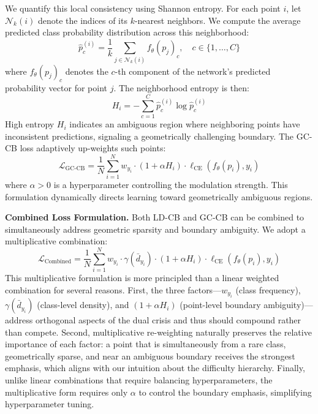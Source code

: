 \documentclass[preprint,12pt]{elsarticle}
\begin{document}
We quantify this local consistency using Shannon entropy. For each point \(i\), let \(\mathcal{N}_k(i)\) denote the indices of its \(k\)-nearest neighbors. We compute the average predicted class probability distribution across this neighborhood:
\begin{equation}
\label{eq:neighborhood_prob}
\hat{p}_c^{(i)} = \frac{1}{k} \sum_{j \in \mathcal{N}_k(i)} f_\theta(p_j)_c, \quad c \in \{1, \ldots, C\}
\end{equation}
where \(f_\theta(p_j)_c\) denotes the \(c\)-th component of the network's predicted probability vector for point \(j\). The neighborhood entropy is then:
\begin{equation}
\label{eq:neighborhood_entropy}
H_i = -\sum_{c=1}^{C} \hat{p}_c^{(i)} \log \hat{p}_c^{(i)}
\end{equation}
High entropy \(H_i\) indicates an ambiguous region where neighboring points have inconsistent predictions, signaling a geometrically challenging boundary. The GC-CB loss adaptively up-weights such points:
\begin{equation}
\label{eq:gc_cb_loss}
\mathcal{L}_{\text{GC-CB}} = \frac{1}{N} \sum_{i=1}^{N} w_{y_i} \cdot (1 + \alpha H_i) \cdot \ell_{\text{CE}}(f_\theta(p_i), y_i)
\end{equation}
where \(\alpha > 0\) is a hyperparameter controlling the modulation strength. This formulation dynamically directs learning toward geometrically ambiguous regions. 

\textbf{Combined Loss Formulation.} Both LD-CB and GC-CB can be combined to simultaneously address geometric sparsity and boundary ambiguity. We adopt a multiplicative combination:
\begin{equation}
\label{eq:combined_loss}
\mathcal{L}_{\text{Combined}} = \frac{1}{N} \sum_{i=1}^{N} w_{y_i} \cdot \gamma(\bar{d}_{y_i}) \cdot (1 + \alpha H_i) \cdot \ell_{\text{CE}}(f_\theta(p_i), y_i)
\end{equation}
This multiplicative formulation is more principled than a linear weighted combination for several reasons. First, the three factors---\(w_{y_i}\) (class frequency), \(\gamma(\bar{d}_{y_i})\) (class-level density), and \((1 + \alpha H_i)\) (point-level boundary ambiguity)---address orthogonal aspects of the dual crisis and thus should compound rather than compete. Second, multiplicative re-weighting naturally preserves the relative importance of each factor: a point that is simultaneously from a rare class, geometrically sparse, and near an ambiguous boundary receives the strongest emphasis, which aligns with our intuition about the difficulty hierarchy. Finally, unlike linear combinations that require balancing hyperparameters, the multiplicative form requires only \(\alpha\) to control the boundary emphasis, simplifying hyperparameter tuning.
\end{document}

